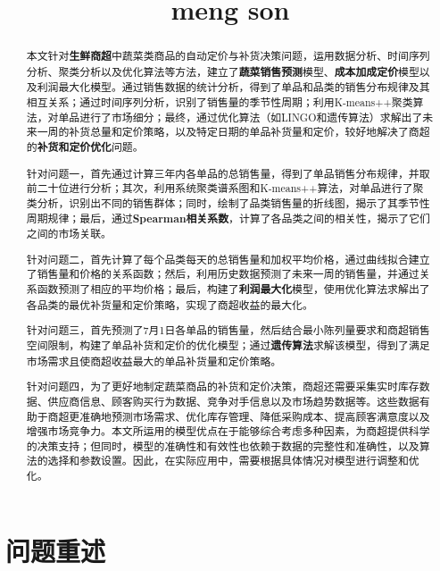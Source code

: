 \documentclass{cumcmthesis}
\title{meng son}
\begin{document}
 \maketitle
 \begin{abstract}
 	
本文针对\textbf{生鲜商超}中蔬菜类商品的自动定价与补货决策问题，运用数据分析、时间序列分析、聚类分析以及优化算法等方法，建立了\textbf{蔬菜销售预测}模型、\textbf{成本加成定价}模型以及利润最大化模型。通过销售数据的统计分析，得到了单品和品类的销售分布规律及其相互关系；通过时间序列分析，识别了销售量的季节性周期；利用K-means++聚类算法，对单品进行了市场细分；最终，通过优化算法（如LINGO和遗传算法）求解出了未来一周的补货总量和定价策略，以及特定日期的单品补货量和定价，较好地解决了商超的\textbf{补货和定价优化}问题。

针对问题一，首先通过计算三年内各单品的总销售量，得到了单品销售分布规律，并取前二十位进行分析；其次，利用系统聚类谱系图和K-means++算法，对单品进行了聚类分析，识别出不同的销售群体；同时，绘制了品类销售量的折线图，揭示了其季节性周期规律；最后，通过\textbf{Spearman相关系数}，计算了各品类之间的相关性，揭示了它们之间的市场关联。

针对问题二，首先计算了每个品类每天的总销售量和加权平均价格，通过曲线拟合建立了销售量和价格的关系函数；然后，利用历史数据预测了未来一周的销售量，并通过关系函数预测了相应的平均价格；最后，构建了\textbf{利润最大化}模型，使用优化算法求解出了各品类的最优补货量和定价策略，实现了商超收益的最大化。

针对问题三，首先预测了7月1日各单品的销售量，然后结合最小陈列量要求和商超销售空间限制，构建了单品补货和定价的优化模型；通过\textbf{遗传算法}求解该模型，得到了满足市场需求且使商超收益最大的单品补货量和定价策略。

针对问题四，为了更好地制定蔬菜商品的补货和定价决策，商超还需要采集实时库存数据、供应商信息、顾客购买行为数据、竞争对手信息以及市场趋势数据等。这些数据有助于商超更准确地预测市场需求、优化库存管理、降低采购成本、提高顾客满意度以及增强市场竞争力。本文所运用的模型优点在于能够综合考虑多种因素，为商超提供科学的决策支持；但同时，模型的准确性和有效性也依赖于数据的完整性和准确性，以及算法的选择和参数设置。因此，在实际应用中，需要根据具体情况对模型进行调整和优化。

\end{abstract}

\section{问题重述}
\end{document}
